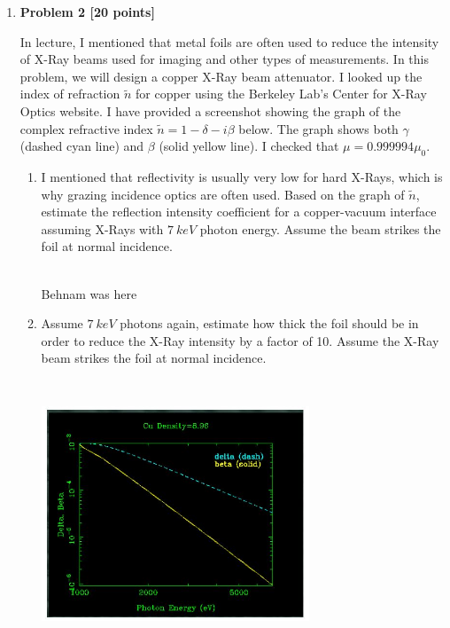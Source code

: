 \documentclass[fleqn]{article}
\begin{document}
\begin{enumerate}
\begin{enumerate}
    \end{enumerate}

  \pagebreak

  \item \textbf{Problem 2 [20 points]} 

  In lecture, I mentioned that metal foils are often used to reduce the intensity of X-Ray beams used for imaging 
  and other types of measurements. In this problem, we will design a copper X-Ray beam attenuator. I looked up the 
  index of refraction $\tilde{n}$ for copper using the Berkeley Lab's Center for X-Ray Optics website. I have 
  provided a screenshot showing the graph of the complex refractive index $\tilde{n}=1-\delta -i \beta$ below. The 
  graph shows both $\gamma$ (dashed cyan line) and $\beta$ (solid yellow line). I checked that $\mu=0.999994 \mu_0$.
    \begin{enumerate}
      \item I mentioned that reflectivity is usually very low for hard X-Rays, which is why grazing incidence
      optics are often used. Based on the graph of $\tilde{n}$, estimate the reflection intensity coefficient for a
      copper-vacuum interface assuming X-Rays with $7 ~ keV$ photon energy. Assume the beam strikes the foil at normal 
      incidence.

          \textcolor{hwColor}{
            \\
            Behnam was here
          }

      \item Assume $7 ~ keV$ photons again, estimate how thick the foil should be in order to reduce the
      X-Ray intensity by a factor of 10. Assume the X-Ray beam strikes the foil at normal incidence.

      \begin{center}
        \includegraphics[height=8cm, width=8cm]{1.JPG}
      \end{center}


\end{enumerate}
\end{enumerate}
\end{document}
